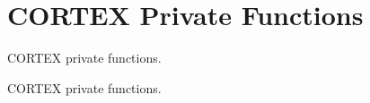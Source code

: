 \hypertarget{group___c_o_r_t_e_x___private___functions}{\section{C\-O\-R\-T\-E\-X Private Functions}
\label{group___c_o_r_t_e_x___private___functions}
}


C\-O\-R\-T\-E\-X private functions.  


C\-O\-R\-T\-E\-X private functions. 